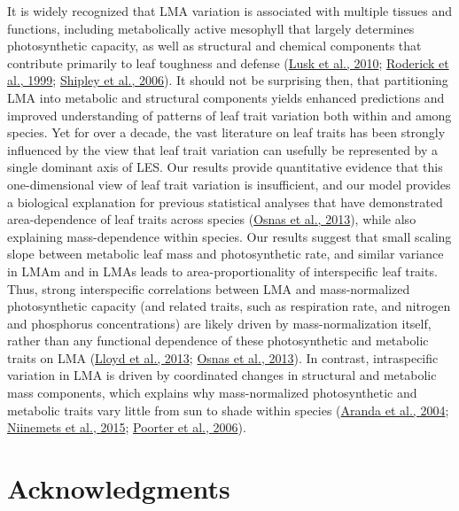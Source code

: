 \documentclass[
  12pt,
  a4paper,
,tablecaptionabove
]{scrartcl}
\begin{document}
It is widely recognized that LMA variation is associated with multiple
tissues and functions, including metabolically active mesophyll that
largely determines photosynthetic capacity, as well as structural and
chemical components that contribute primarily to leaf toughness and
defense (\protect\hyperlink{ref-Lusk2010}{Lusk et al., 2010};
\protect\hyperlink{ref-Roderick1999}{Roderick et al., 1999};
\protect\hyperlink{ref-Shipley2006}{Shipley et al., 2006}). It should
not be surprising then, that partitioning LMA into metabolic and
structural components yields enhanced predictions and improved
understanding of patterns of leaf trait variation both within and among
species. Yet for over a decade, the vast literature on leaf traits has
been strongly influenced by the view that leaf trait variation can
usefully be represented by a single dominant axis of LES. Our results
provide quantitative evidence that this one-dimensional view of leaf
trait variation is insufficient, and our model provides a biological
explanation for previous statistical analyses that have demonstrated
area-dependence of leaf traits across species
(\protect\hyperlink{ref-Osnas2013}{Osnas et al., 2013}), while also
explaining mass-dependence within species. Our results suggest that
small scaling slope between metabolic leaf mass and photosynthetic rate,
and similar variance in LMAm and in LMAs leads to area-proportionality
of interspecific leaf traits. Thus, strong interspecific correlations
between LMA and mass-normalized photosynthetic capacity (and related
traits, such as respiration rate, and nitrogen and phosphorus
concentrations) are likely driven by mass-normalization itself, rather
than any functional dependence of these photosynthetic and metabolic
traits on LMA (\protect\hyperlink{ref-Lloyd2013}{Lloyd et al., 2013};
\protect\hyperlink{ref-Osnas2013}{Osnas et al., 2013}). In contrast,
intraspecific variation in LMA is driven by coordinated changes in
structural and metabolic mass components, which explains why
mass-normalized photosynthetic and metabolic traits vary little from sun
to shade within species (\protect\hyperlink{ref-Aranda2004}{Aranda et
al., 2004}; \protect\hyperlink{ref-Niinemets2015}{Niinemets et al.,
2015}; \protect\hyperlink{ref-Poorter2006b}{Poorter et al., 2006}).

\hypertarget{acknowledgments}{%
\section{Acknowledgments}\label{acknowledgments}}
\end{document}
